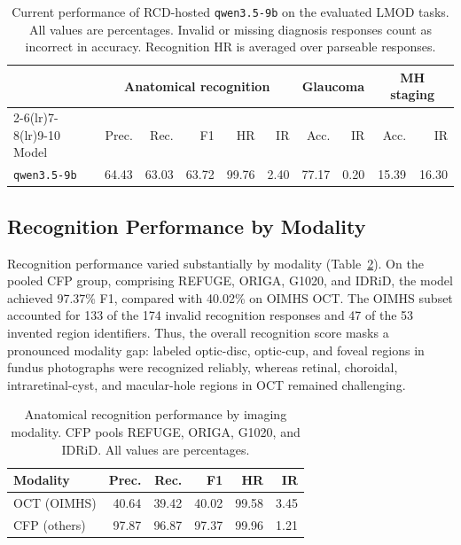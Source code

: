 \begin{table}[t]
    \centering
    \caption{Current performance of RCD-hosted \texttt{qwen3.5-9b} on the
    evaluated LMOD tasks. All values are percentages. Invalid or missing
    diagnosis responses count as incorrect in accuracy. Recognition HR is
    averaged over parseable responses.}
    \label{tab:results}
    \small
    \begin{tabular}{lrrrrrrrrr}
        \toprule
        & \multicolumn{5}{c}{Anatomical recognition}
        & \multicolumn{2}{c}{Glaucoma}
        & \multicolumn{2}{c}{MH staging} \\
        \cmidrule(lr){2-6}\cmidrule(lr){7-8}\cmidrule(lr){9-10}
        Model & Prec. & Rec. & F1 & HR & IR & Acc. & IR & Acc. & IR \\
        \midrule
        \texttt{qwen3.5-9b}
        & 64.43 & 63.03 & 63.72 & 99.76 & 2.40
        & 77.17 & 0.20 & 15.39 & 16.30 \\
        \bottomrule
    \end{tabular}
\end{table}

\subsection{Recognition Performance by Modality}

Recognition performance varied substantially by modality
(Table~\ref{tab:recognition_by_modality}).  On the pooled CFP group, comprising
REFUGE, ORIGA, G1020, and IDRiD, the model achieved 97.37\% F1, compared with
40.02\% on OIMHS OCT.  The OIMHS subset accounted for 133 of the 174 invalid
recognition responses and 47 of the 53 invented region identifiers.  Thus, the
overall recognition score masks a pronounced modality gap: labeled optic-disc,
optic-cup, and foveal regions in fundus photographs were recognized reliably,
whereas retinal, choroidal, intraretinal-cyst, and macular-hole regions in OCT
remained challenging.

\begin{table}[t]
    \centering
    \caption{Anatomical recognition performance by imaging modality. CFP
    pools REFUGE, ORIGA, G1020, and IDRiD. All values are percentages.}
    \label{tab:recognition_by_modality}
    \small
    \begin{tabular}{lrrrrr}
        \toprule
        Modality & Prec. & Rec. & F1 & HR & IR \\
        \midrule
        OCT (OIMHS) & 40.64 & 39.42 & 40.02 & 99.58 & 3.45 \\
        CFP (others) & 97.87 & 96.87 & 97.37 & 99.96 & 1.21 \\
        \bottomrule
    \end{tabular}
\end{table}

